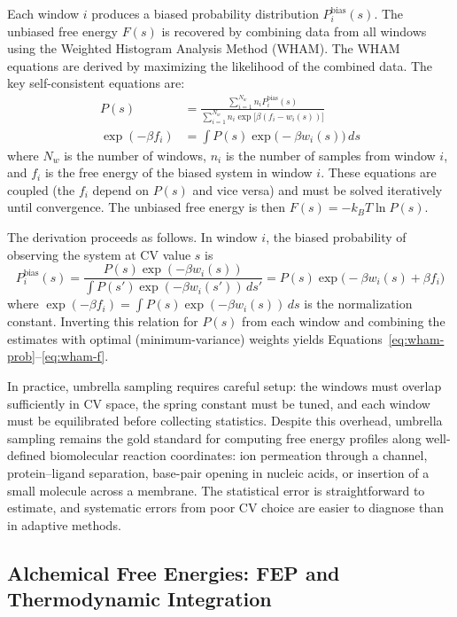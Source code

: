 Each window $i$ produces a biased probability distribution $P_i^{\text{bias}}(s)$. The unbiased free energy $F(s)$ is recovered by combining data from all windows using the Weighted Histogram Analysis Method (WHAM). The WHAM equations are derived by maximizing the likelihood of the combined data. The key self-consistent equations are:
\begin{align}
\label{eq:wham-prob}
P(s) &= \frac{\sum_{i=1}^{N_w} n_i P_i^{\text{bias}}(s)}{\sum_{i=1}^{N_w} n_i \exp\bigl[\beta(f_i - w_i(s))\bigr]} \\[6pt]
\label{eq:wham-f}
\exp(-\beta f_i) &= \int P(s) \exp\bigl(-\beta w_i(s)\bigr) \, ds
\end{align}
where $N_w$ is the number of windows, $n_i$ is the number of samples from window $i$, and $f_i$ is the free energy of the biased system in window $i$. These equations are coupled (the $f_i$ depend on $P(s)$ and vice versa) and must be solved iteratively until convergence. The unbiased free energy is then $F(s) = -k_BT \ln P(s)$.

The derivation proceeds as follows. In window $i$, the biased probability of observing the system at CV value $s$ is
\begin{equation}
\label{eq:wham-deriv1}
P_i^{\text{bias}}(s) = \frac{P(s)\exp(-\beta w_i(s))}{\int P(s')\exp(-\beta w_i(s'))\,ds'} = P(s)\exp\bigl(-\beta w_i(s) + \beta f_i\bigr)
\end{equation}
where $\exp(-\beta f_i) = \int P(s)\exp(-\beta w_i(s))\,ds$ is the normalization constant. Inverting this relation for $P(s)$ from each window and combining the estimates with optimal (minimum-variance) weights yields Equations~\ref{eq:wham-prob}--\ref{eq:wham-f}.

In practice, umbrella sampling requires careful setup: the windows must overlap sufficiently in CV space, the spring constant must be tuned, and each window must be equilibrated before collecting statistics. Despite this overhead, umbrella sampling remains the gold standard for computing free energy profiles along well-defined biomolecular reaction coordinates: ion permeation through a channel, protein--ligand separation, base-pair opening in nucleic acids, or insertion of a small molecule across a membrane. The statistical error is straightforward to estimate, and systematic errors from poor CV choice are easier to diagnose than in adaptive methods.

\subsection{Alchemical Free Energies: FEP and Thermodynamic Integration}
\label{sec:fep-ti}

